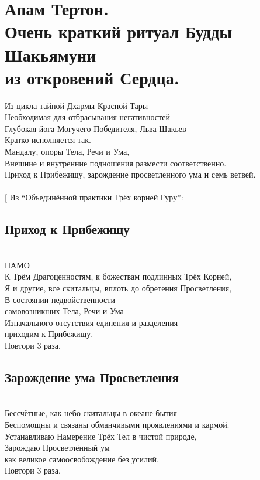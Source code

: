 \section{Апам Тертон.\\Очень краткий ритуал Будды Шакьямуни\\из откровений Сердца.}
\scriptsize
Из цикла тайной Дхармы Красной Тары\\
Необходимая для отбрасывания негативностей \\
Глубокая йога Могучего Победителя, Льва Шакьев\\
Кратко исполняется так.\\
Мандалу, опоры Тела, Речи и Ума,\\
Внешние и внутренние подношения размести соответственно.\\
Приход к Прибежищу, зарождение просветленного ума и семь ветвей.\\
\\
\vspace{1cm}
\normalsize
[ \scriptsize Из “Объединённой практики Трёх корней Гуру”: \normalsize
\subsection*{Приход к Прибежищу}
\\

НАМО\\
К Трём Драгоценностям, к божествам подлинных Трёх Корней,\\
Я и другие, все скитальцы, вплоть до обретения Просветления,\\
В состоянии недвойственности \\ \indent самовозникших Тела, Речи и Ума\\
Изначального отсутствия единения и разделения \\ \indent приходим к Прибежищу.\\
\scriptsize
\indent Повтори 3 раза.
\normalsize

\subsection*{Зарождение ума Просветления}
\\
Бессчётные, как небо скитальцы в океане бытия\\
Беспомощны и связаны обманчивыми проявлениями и кармой.\\
Устанавливаю Намерение Трёх Тел в чистой природе, \\
Зарождаю Просветлённый ум \\ \indent как великое самоосвобождение без усилий. \\
\scriptsize
\indent Повтори 3 раза.\\
\normalsize

